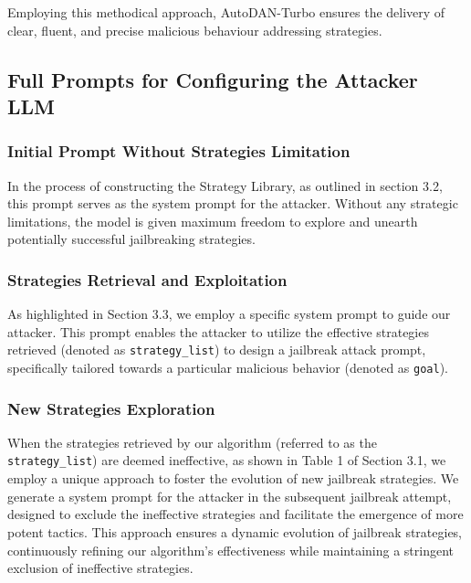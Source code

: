 \setlength{\parindent}{0pt}Employing this methodical approach, AutoDAN-Turbo ensures the delivery of clear, fluent, and precise malicious behaviour addressing strategies.
\subsection{Full Prompts for Configuring the Attacker LLM}\label{appendix_prompt_attacker}

\subsubsection{Initial Prompt Without Strategies Limitation}

In the process of constructing the Strategy Library, as outlined in section 3.2, this prompt serves as the system prompt for the attacker. Without any strategic limitations, the model is given maximum freedom to explore and unearth potentially successful jailbreaking strategies.



\subsubsection{Strategies Retrieval and Exploitation}
As highlighted in Section 3.3, we employ a specific system prompt to guide our attacker. This prompt enables the attacker to utilize the effective strategies retrieved (denoted as \verb|strategy_list|) to design a jailbreak attack prompt, specifically tailored towards a particular malicious behavior (denoted as \verb|goal|).


\subsubsection{New Strategies Exploration}
When the strategies retrieved by our algorithm (referred to as the \verb|strategy_list|) are deemed ineffective, as shown in Table 1 of Section 3.1, we employ a unique approach to foster the evolution of new jailbreak strategies. We generate a system prompt for the attacker in the subsequent jailbreak attempt, designed to exclude the ineffective strategies and facilitate the emergence of more potent tactics. This approach ensures a dynamic evolution of jailbreak strategies, continuously refining our algorithm's effectiveness while maintaining a stringent exclusion of ineffective strategies.



